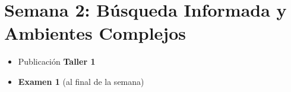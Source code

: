 
\chapter{Semana 2: Búsqueda Informada y Ambientes Complejos}

\begin{remark}
\begin{itemize}
    \item Publicación \textbf{Taller 1}
    \item \textbf{Examen 1} (al final de la semana)
\end{itemize}
\end{remark}




